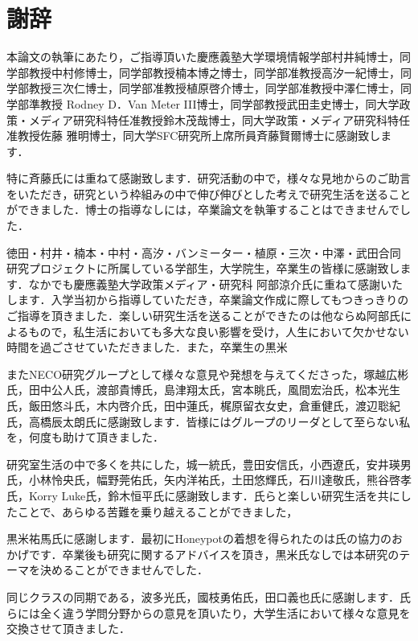 \chapter*{謝辞}
\label{thanks}


本論文の執筆にあたり，ご指導頂いた慶應義塾大学環境情報学部村井純博士，同学部教授中村修博士，同学部教授楠本博之博士，同学部准教授高汐一紀博士，同学部教授三次仁博士，同学部准教授植原啓介博士，同学部准教授中澤仁博士，同学部準教授 Rodney D．Van Meter III博士，同学部教授武田圭史博士，同大学政策・メディア研究科特任准教授鈴木茂哉博士，同大学政策・メディア研究科特任准教授佐藤 雅明博士，同大学SFC研究所上席所員斉藤賢爾博士に感謝致します．


特に斉藤氏には重ねて感謝致します．研究活動の中で，様々な見地からのご助言をいただき，研究という枠組みの中で伸び伸びとした考えで研究生活を送ることができました．博士の指導なしには，卒業論文を執筆することはできませんでした．


徳田・村井・楠本・中村・高汐・バンミーター・植原・三次・中澤・武田合同研究プロジェクトに所属している学部生，大学院生，卒業生の皆様に感謝致します．なかでも慶應義塾大学政策メディア・研究科 阿部涼介氏に重ねて感謝いたします．入学当初から指導していただき，卒業論文作成に際してもつきっきりのご指導を頂きました．楽しい研究生活を送ることができたのは他ならぬ阿部氏によるもので，私生活においても多大な良い影響を受け，人生において欠かせない時間を過ごさせていただきました．また，卒業生の黒米


またNECO研究グループとして様々な意見や発想を与えてくださった，塚越広彬氏，田中公人氏，渡部貴博氏，島津翔太氏，宮本眺氏，風間宏治氏，松本光生氏，飯田悠斗氏，木内啓介氏，田中蓮氏，梶原留衣女史，倉重健氏，渡辺聡紀氏，高橋辰太朗氏に感謝致します．皆様にはグループのリーダとして至らない私を，何度も助けて頂きました．


研究室生活の中で多くを共にした，城一統氏，豊田安信氏，小西遼氏，安井瑛男氏，小林怜央氏，幅野莞佑氏，矢内洋祐氏，土田悠輝氏，石川達敬氏，熊谷啓孝氏，Korry Luke氏，鈴木恒平氏に感謝致します．氏らと楽しい研究生活を共にしたことで、あらゆる苦難を乗り越えることができました，

黒米祐馬氏に感謝します．最初にHoneypotの着想を得られたのは氏の協力のおかげです．卒業後も研究に関するアドバイスを頂き，黒米氏なしでは本研究のテーマを決めることができませんでした．

同じクラスの同期である，波多光氏，國枝勇佑氏，田口義也氏に感謝します．氏らには全く違う学問分野からの意見を頂いたり，大学生活において様々な意見を交換させて頂きました．


